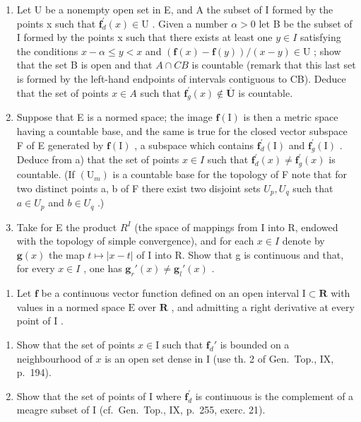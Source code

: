 \begin{enumerate}
\def\labelenumi{\alph{enumi})}
\item
  Let U be a nonempty open set in E, and A the subset of I formed by the points x such that \(\mathbf{f}_{d}^{\prime}(x) \in \mathrm{U}\) . Given a number \(\alpha > 0\) let B be the subset of I formed by the points x such that there exists at least one \(y \in I\) satisfying the conditions \(x - \alpha \leqslant y < x\) and \((\mathbf{f}(x) - \mathbf{f}(y)) / (x - y) \in \mathrm{U}\) ; show that the set B is open and that \(A \cap CB\) is countable (remark that this last set is formed by the left-hand endpoints of intervals contiguous to CB). Deduce that the set of points \(x \in A\) such that \(\mathbf{f}_{g}^{\prime}(x) \notin \overline{\mathbf{U}}\) is countable.
\item
  Suppose that E is a normed space; the image \(\mathbf{f}(\mathrm{I})\) is then a metric space having a countable base, and the same is true for the closed vector subspace F of E generated by \(\mathbf{f}(\mathrm{I})\) , a subspace which contains \(\mathbf{f}_{d}^{\prime}(\mathrm{I})\) and \(\mathbf{f}_{g}^{\prime}(\mathrm{I})\) . Deduce from a) that the set of points \(x \in I\) such that \(\mathbf{f}_{d}^{\prime}(x) \neq \mathbf{f}_{g}^{\prime}(x)\) is countable. (If \((\mathrm{U}_{m})\) is a countable base for the topology of F note that for two distinct points a, b of F there exist two disjoint sets \(U_{p}, U_{q}\) such that \(a \in U_{p}\) and \(b \in U_{q}\) .)
\item
  Take for E the product \(R^{I}\) (the space of mappings from I into R, endowed with the topology of simple convergence), and for each \(x \in I\) denote by \(\mathbf{g}(x)\) the map \(t \mapsto |x - t|\) of I into R. Show that g is continuous and that, for every \(x \in I\) , one has \(\mathbf{g}_{r}'(x) \neq \mathbf{g}_{l}'(x)\) .
\end{enumerate}

\begin{enumerate}
\def\labelenumi{\arabic{enumi})}
\setcounter{enumi}{4}
\tightlist
\item
  Let \(\mathbf{f}\) be a continuous vector function defined on an open interval \(\mathrm{I} \subset \mathbf{R}\) with values in a normed space \(\mathrm{E}\) over \(\mathbf{R}\) , and admitting a right derivative at every point of \(\mathrm{I}\) .
\end{enumerate}

\begin{enumerate}
\def\labelenumi{\alph{enumi})}
\item
  Show that the set of points \(x \in \mathrm{I}\) such that \(\mathbf{f}_d'\) is bounded on a neighbourhood of \(x\) is an open set dense in \(\mathrm{I}\) (use th. 2 of Gen.~Top., IX, p.~194).
\item
  Show that the set of points of I where \(\mathbf{f}_d^{\prime}\) is continuous is the complement of a meagre subset of I (cf.~Gen.~Top., IX, p.~255, exerc. 21).
\end{enumerate}

